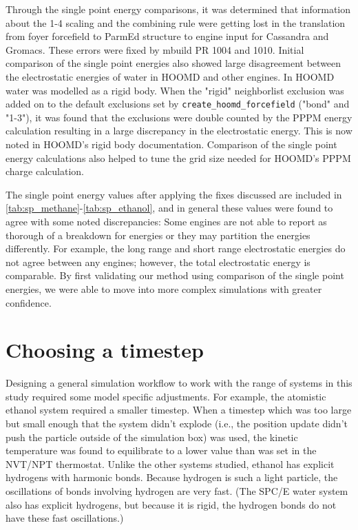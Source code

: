 Through the single point energy comparisons, it was determined that information about the 1-4 scaling and the combining rule were getting lost in the translation from foyer forcefield to ParmEd structure to engine input for Cassandra and Gromacs.
These errors were fixed by mbuild PR 1004 and 1010.
Initial comparison of the single point energies also showed large disagreement between the electrostatic energies of water in HOOMD and other engines. 
In HOOMD water was modelled as a rigid body. 
When the "rigid" neighborlist exclusion was added on to the default exclusions set by \lstinline{create_hoomd_forcefield} ("bond" and "1-3"), it was found that the exclusions were double counted by the PPPM energy calculation resulting in a large discrepancy in the electrostatic energy.
This is now noted in HOOMD's rigid body documentation.
Comparison of the single point energy calculations also helped to tune the grid size needed for HOOMD's PPPM charge calculation. 

The single point energy values after applying the fixes discussed are included in \autoref{tab:sp_methane}-\autoref{tab:sp_ethanol}, and in general these values were found to agree with some noted discrepancies:
Some engines are not able to report as thorough of a breakdown for energies or they may partition the energies differently.
For example, the long range and short range electrostatic energies do not agree between any engines; however, the total electrostatic energy is comparable.
By first validating our method using comparison of the single point energies, we were able to move into more complex simulations with greater confidence.

\section{Choosing a timestep}

Designing a general simulation workflow to work with the range of systems in this study required some model specific adjustments.
For example, the atomistic ethanol system required a smaller timestep.
When a timestep which was too large but small enough that the system didn't explode (i.e., the position update didn't push the particle outside of the simulation box) was used, the kinetic temperature was found to equilibrate to a lower value than was set in the NVT/NPT thermostat.
Unlike the other systems studied, ethanol has explicit hydrogens with harmonic bonds. 
Because hydrogen is such a light particle, the oscillations of bonds involving hydrogen are very fast.
(The SPC/E water system also has explicit hydrogens, but because it is rigid, the hydrogen bonds do not have these fast oscillations.) 

